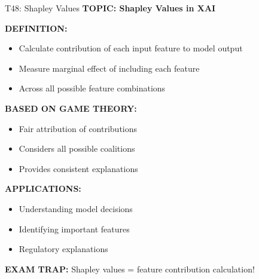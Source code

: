 \documentclass[8pt]{beamer}
\begin{document}
	\begin{frame}{T48: Shapley Values}
		\fontsize{6.5}{7.5}\selectfont
		\textbf{TOPIC: Shapley Values in XAI}
		
		\vspace{0.1cm}
		\textbf{DEFINITION:}
		\begin{itemize}
			\item Calculate contribution of each input feature to model output
			\item Measure marginal effect of including each feature
			\item Across all possible feature combinations
		\end{itemize}
		
		\vspace{0.1cm}
		\textbf{BASED ON GAME THEORY:}
		\begin{itemize}
			\item Fair attribution of contributions
			\item Considers all possible coalitions
			\item Provides consistent explanations
		\end{itemize}
		
		\vspace{0.1cm}
		\textbf{APPLICATIONS:}
		\begin{itemize}
			\item Understanding model decisions
			\item Identifying important features
			\item Regulatory explanations
		\end{itemize}
		
		\textcolor{myred}{\textbf{EXAM TRAP:}} Shapley values = \textcolor{myblue}{feature contribution calculation}!
	\end{frame}
	
\end{document}
